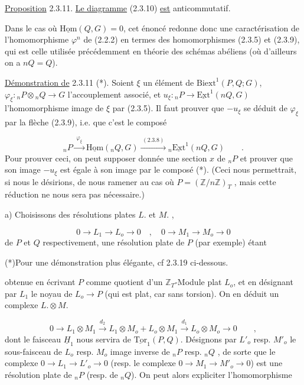 \underline{Proposition} 2.3.11. \underline{Le diagramme} (2.3.10) \underline{est} anticommutatif.

Dans le cas où $\underline{\mathrm{Hom}}(Q,G) = 0$, cet énoncé redonne donc une caractérisation de l'homomorphisme $\varphi^n$ de (2.2.2) en termes des homomorphismes (2.3.5) et (2.3.9), qui est celle utilisée précédemment en théorie des schémas abéliens (où d'ailleurs on a $nQ = Q$).

\underline{Démonstration de} 2.3.11 (*). Soient $\xi$ un élément de $\mathrm{Biext}^1(P,Q;G)$, $\varphi_\xi : {}_nP \otimes {}_nQ \longrightarrow G$ l'accouplement associé, et $u_\xi : {}_nP \longrightarrow \underline{\mathrm{Ext}}^1(nQ,G)$ l'homomorphisme image de $\xi$ par (2.3.5). Il faut prouver que $-u_\xi$ se déduit de $\varphi_\xi$ par la flèche (2.3.9), i.e. que c'est le composé

\begin{equation}\tag{*}
{}_nP \xrightarrow{\;\varphi_\xi\;} \underline{\mathrm{Hom}}({}_nQ,G) \xrightarrow{\;(2.3.8)\;} {}_n\underline{\mathrm{Ext}}^1(nQ,G) \qquad .
\end{equation}
Pour prouver ceci, on peut supposer donnée une section $x$ de ${}_nP$ et prouver que son image $-u_\xi$ est égale à son image par le composé (*). (Ceci nous permettrait, si nous le désirions, de nous ramener au cas où $P = (\mathbb{Z}/n\mathbb{Z})_T$ , mais cette réduction ne nous sera pas nécessaire.)

a) Choisissons des résolutions plates $L.$ et $M.$ ,

\begin{equation*}
0 \longrightarrow L_1 \longrightarrow L_o \longrightarrow 0 \quad , \quad 0 \longrightarrow M_1 \longrightarrow M_o \longrightarrow 0
\end{equation*}
de $P$ et $Q$ respectivement, une résolution plate de $P$ (par exemple) étant 

(*)\quad Pour une démonstration plus élégante, cf 2.3.19 ci-dessous.



 obtenue en écrivant $P$ comme quotient d'un $\mathbb{Z}_T$-Module plat $L_o$, et en désignant par $L_1$ le noyau de $L_o \longrightarrow P$ (qui est plat, car sans torsion). On en déduit un complexe $L.\otimes M.$

\begin{equation*}
0 \longrightarrow L_1 \otimes M_1 \overset{d_2}{\longrightarrow} L_1 \otimes M_o + L_o \otimes M_1 \overset{d_1}{\longrightarrow} L_o \otimes M_o \longrightarrow 0 \qquad ,
\end{equation*}
dont le faisceau $\underline{H}_1$ nous servira de $\underline{\mathrm{Tor}}_1(P,Q)$. Désignons par $L'_o$ resp. $M'_o$ le sous-faisceau de $L_o$ resp. $M_o$ image inverse de ${}_nP$ resp. ${}_nQ$ , de sorte que le complexe $0 \longrightarrow L_1 \longrightarrow L'_o \longrightarrow 0$ (resp. le complexe $0 \longrightarrow M_1 \longrightarrow M'_o \longrightarrow 0$) est une résolution plate de ${}_nP$ (resp. de ${}_nQ$). On peut alors expliciter l'homomorphisme

